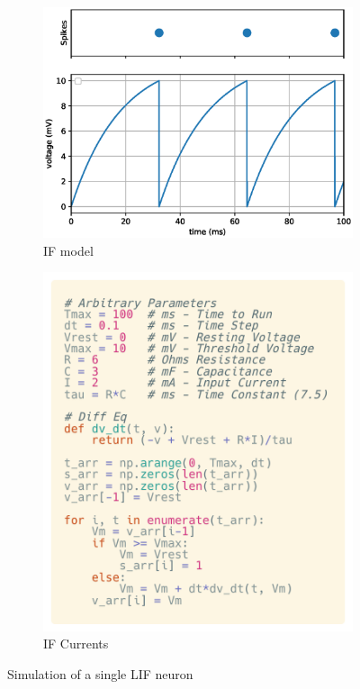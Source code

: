\begin{figure}[h!]
    \begin{subfigure}{.6\textwidth}
        \centering
        \includegraphics[width=1.0\linewidth]{figures/graphs/singleSpikingNeuron.eps}
        \caption{IF model}
        \label{fig:LIFSingleSpikeGraph}
    \end{subfigure}%
    \begin{subfigure}{.5\textwidth}
        \centering
        \includegraphics[width=1.0\linewidth]{figures/code/SingleLIFCode.png}
        \caption{IF Currents}
        \label{fig:LIFCode}
    \end{subfigure}
    \caption{Simulation of a single LIF neuron}
    \label{fig:LIFSingleSpikeGraphCode}
\end{figure}

